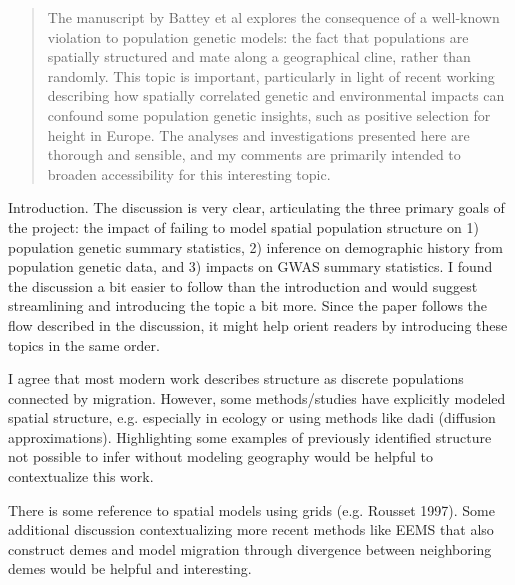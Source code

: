 \begin{quote}
    The manuscript by Battey et al explores the consequence of a well-known
    violation to population genetic models: the fact that populations are
    spatially structured and mate along a geographical cline, rather than
    randomly. This topic is important, particularly in light of recent working
    describing how spatially correlated genetic and environmental impacts can
    confound some population genetic insights, such as positive selection for
    height in Europe. The analyses and investigations presented here are
    thorough and sensible, and my comments are primarily intended to broaden
    accessibility for this interesting topic.
\end{quote}

\begin{point}{}
    Introduction. The discussion is very clear, articulating the three primary goals of the project: the impact of failing to model spatial population structure on 1) population genetic summary statistics, 2) inference on demographic history from population genetic data, and 3) impacts on GWAS summary statistics. I found the discussion a bit easier to follow than the introduction and would suggest streamlining and introducing the topic a bit more. Since the paper follows the flow described in the discussion, it might help orient readers by introducing these topics in the same order.
\end{point}


\begin{point}{}
    I agree that most modern work describes structure as discrete populations connected by migration. However, some methods/studies have explicitly modeled spatial structure, e.g. especially in ecology or using methods like dadi (diffusion approximations). Highlighting some examples of previously identified structure not possible to infer without modeling geography would be helpful to contextualize this work.
\end{point}


\begin{point}{}
    There is some reference to spatial models using grids (e.g. Rousset 1997). Some additional discussion contextualizing more recent methods like EEMS that also construct demes and model migration through divergence between neighboring demes would be helpful and interesting.
\end{point}

